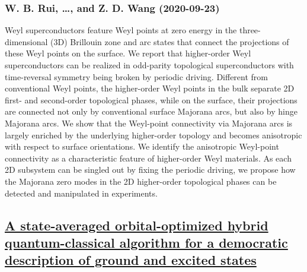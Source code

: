 \subsubsection*{W. B. Rui, \dots, and Z. D. Wang (2020-09-23)}
Weyl superconductors feature Weyl points at zero energy in the
three-dimensional (3D) Brillouin zone and arc states that connect the
projections of these Weyl points on the surface. We report that higher-order
Weyl superconductors can be realized in odd-parity topological superconductors
with time-reversal symmetry being broken by periodic driving. Different from
conventional Weyl points, the higher-order Weyl points in the bulk separate 2D
first- and second-order topological phases, while on the surface, their
projections are connected not only by conventional surface Majorana arcs, but
also by hinge Majorana arcs. We show that the Weyl-point connectivity via
Majorana arcs is largely enriched by the underlying higher-order topology and
becomes anisotropic with respect to surface orientations. We identify the
anisotropic Weyl-point connectivity as a characteristic feature of higher-order
Weyl materials. As each 2D subsystem can be singled out by fixing the periodic
driving, we propose how the Majorana zero modes in the 2D higher-order
topological phases can be detected and manipulated in experiments.

\subsection*{\href{http://arxiv.org/abs/2009.11417v1}{A state-averaged orbital-optimized hybrid quantum-classical algorithm  for a democratic description of ground and excited states}}
